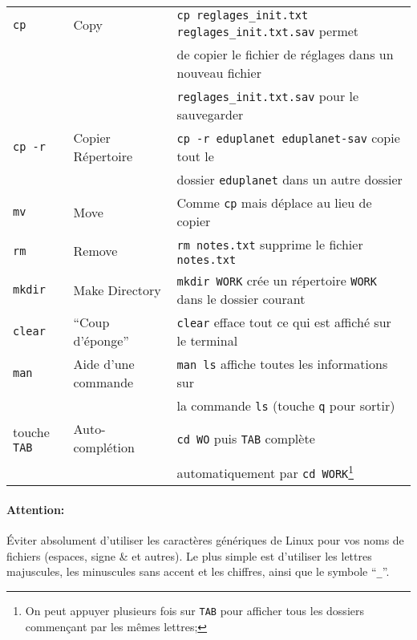 \documentclass[a4paper,10pt]{article}
\begin{document}
\begin{savenotes}
\begin{table}[h!]
\begin{tabular}{lll}
\texttt{cp} & Copy & \texttt{cp reglages\_init.txt
reglages\_init.txt.sav} permet \\
& & de copier le fichier de réglages dans un nouveau fichier \\
& & \texttt{reglages\_init.txt.sav} pour le sauvegarder \\
\texttt{cp -r} & Copier Répertoire &
\texttt{cp -r eduplanet eduplanet-sav} copie tout le \\
& & dossier \texttt{eduplanet} dans un autre dossier \\
\texttt{mv} & Move & Comme \texttt{cp} mais déplace au lieu de copier
\\
\texttt{rm} & Remove & \texttt{rm notes.txt} supprime le fichier
\texttt{notes.txt} \\
\texttt{mkdir} & Make Directory & \texttt{mkdir WORK} crée un
répertoire \texttt{WORK} dans le dossier courant \\
\texttt{clear} & ``Coup d'éponge'' & \texttt{clear} efface tout ce qui
est affiché sur le terminal \\
\texttt{man} & Aide d'une commande & \texttt{man ls} affiche toutes les
informations sur \\
& & la commande \texttt{ls} (touche \texttt{q} pour sortir) \\
touche \texttt{TAB} & Auto-complétion & \texttt{cd WO} puis \texttt
{TAB} complète \\
& & automatiquement par \texttt{cd WORK}\footnote{On peut appuyer
plusieurs fois sur \texttt{TAB} pour afficher tous les dossiers commençant par
les mêmes lettres;} \\ \hline
\end{tabular}
\end{table}
\end{savenotes}

\paragraph{Attention:} \'Eviter absolument d'utiliser les caractères génériques
de Linux pour vos noms de fichiers (espaces, signe \& et autres). Le plus
simple est d'utiliser les lettres majuscules, les minuscules sans accent et les
chiffres, ainsi que le symbole ``\texttt{\_}''.
\end{document}

